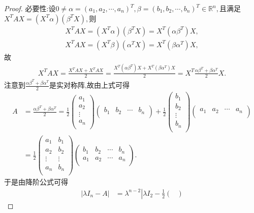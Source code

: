 \documentclass[../../main.tex]{subfiles}
\begin{document}
\begin{proof}
{\heiti 必要性:}设$0\ne \alpha =( a_1,a_2,\cdots ,a_n ) ^T,\beta =( b_1,b_2,\cdots ,b_n ) ^T\in \mathbb{R} ^n,$且满足$X^TAX=( X^T\alpha ) ( \beta ^TX ),$则
\begin{align*}
X^TAX=( X^T\alpha ) ( \beta ^TX ) =X^T( \alpha \beta ^T ) X,\\
X^TAX=( X^T\beta ) ( \alpha ^TX ) =X^T( \beta \alpha ^T ) X,
\end{align*}
故
\begin{align*}
X^TAX=\frac{X^TAX+X^TAX}{2}=\frac{X^T( \alpha \beta ^T ) X+X^T( \beta \alpha ^T ) X}{2}=X^T\frac{\alpha \beta ^T+\beta \alpha ^T}{2}X.
\end{align*}
注意到$\frac{\alpha \beta ^T+\beta \alpha ^T}{2}$是实对称阵,故由上式可得
\begin{align*}
A&=\frac{\alpha \beta ^T+\beta \alpha ^T}{2}=\frac{1}{2}\begin{pmatrix}
a_1\\
a_2\\
\vdots\\
a_n\\
\end{pmatrix}\begin{pmatrix}
b_1&		b_2&		\cdots&		b_n\\
\end{pmatrix} +\frac{1}{2}\begin{pmatrix}
b_1\\
b_2\\
\vdots\\
b_n\\
\end{pmatrix}\begin{pmatrix}
a_1&		a_2&		\cdots&		a_n\\
\end{pmatrix} 
\\
&=\frac{1}{2}\begin{pmatrix}
a_1&		b_1\\
a_2&		b_2\\
\vdots&		\vdots\\
a_n&		b_n\\
\end{pmatrix}\begin{pmatrix}
b_1&		b_2&		\cdots&		b_n\\
a_1&		a_2&		\cdots&		a_n\\
\end{pmatrix}.
\end{align*}
于是由降阶公式可得
\begin{align*}
| \lambda I_n-A |&=\lambda ^{n-2}\left| \lambda I_2-\frac{1}{2}\begin{pmatrix}

\end{pmatrix}
\end{align*}
\end{proof}
\end{document}
